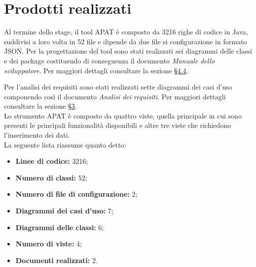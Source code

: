 
\section{Prodotti realizzati}\label{sec:prodotti-ottenuti}

Al termine dello stage, il tool APAT è composto da 3216 righe di codice in Java, suddivisi a loro volta in 52 file e dipende da due file si configurazione in formato JSON.
Per la progettazione del tool sono stati realizzati sei diagrammi delle classi e dei package costituendo di conseguenza il documento \textit{Manuale dello sviluppatore}.
Per maggiori dettagli consultare la sezione \hyperref[sec:progettazione]{\S4.4}.

Per l'analisi dei requisiti sono stati realizzati sette diagrammi dei casi d'uso componendo così il documento \textit{Analisi dei requisiti}.
Per maggiori dettagli consultare la sezione \hyperref[ch:analisi-requisiti]{\S3}.\\
Lo strumento APAT è composto da quattro viste, quella principale in cui sono presenti le principali funzionalità disponibili e altre tre viste che richiedono l'inserimento dei dati.\\
La seguente lista riassume quanto detto:

\begin{itemize}
    \item \textbf{Linee di codice:} 3216;
    \item \textbf{Numero di classi:} 52;
    \item \textbf{Numero di file di configurazione:} 2;
    \item \textbf{Diagrammi dei casi d'uso:} 7;
    \item \textbf{Diagrammi delle classi:} 6;
    \item \textbf{Numero di viste:} 4;
    \item \textbf{Documenti realizzati:} 2.
\end{itemize}